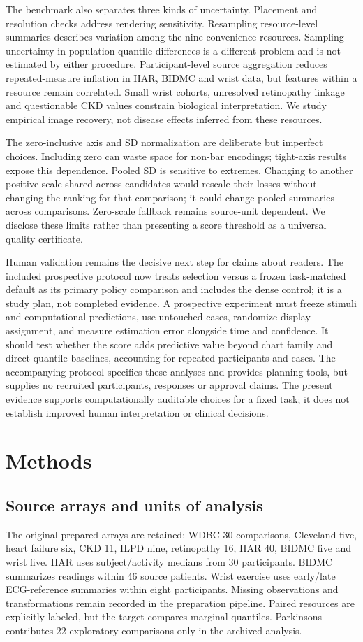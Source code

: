 \documentclass[11pt]{article}
\begin{document}
The benchmark also separates three kinds of uncertainty. Placement and resolution checks address rendering sensitivity. Resampling resource-level summaries describes variation among the nine convenience resources. Sampling uncertainty in population quantile differences is a different problem and is not estimated by either procedure. Participant-level source aggregation reduces repeated-measure inflation in HAR, BIDMC and wrist data, but features within a resource remain correlated. Small wrist cohorts, unresolved retinopathy linkage and questionable CKD values constrain biological interpretation. We study empirical image recovery, not disease effects inferred from these resources.

The zero-inclusive axis and SD normalization are deliberate but imperfect choices. Including zero can waste space for non-bar encodings; tight-axis results expose this dependence. Pooled SD is sensitive to extremes. Changing to another positive scale shared across candidates would rescale their losses without changing the ranking for that comparison; it could change pooled summaries across comparisons. Zero-scale fallback remains source-unit dependent. We disclose these limits rather than presenting a score threshold as a universal quality certificate.

Human validation remains the decisive next step for claims about readers. The included prospective protocol now treats selection versus a frozen task-matched default as its primary policy comparison and includes the dense control; it is a study plan, not completed evidence. A prospective experiment must freeze stimuli and computational predictions, use untouched cases, randomize display assignment, and measure estimation error alongside time and confidence. It should test whether the score adds predictive value beyond chart family and direct quantile baselines, accounting for repeated participants and cases. The accompanying protocol specifies these analyses and provides planning tools, but supplies no recruited participants, responses or approval claims. The present evidence supports computationally auditable choices for a fixed task; it does not establish improved human interpretation or clinical decisions.

\section*{Methods}
\subsection*{Source arrays and units of analysis}
The original prepared arrays are retained: WDBC 30 comparisons, Cleveland five, heart failure six, CKD 11, ILPD nine, retinopathy 16, HAR 40, BIDMC five and wrist five. HAR uses subject/activity medians from 30 participants. BIDMC summarizes readings within 46 source patients. Wrist exercise uses early/late ECG-reference summaries within eight participants.\cite{pimentel2017,jarchi2017} Missing observations and transformations remain recorded in the preparation pipeline. Paired resources are explicitly labeled, but the target compares marginal quantiles. Parkinsons contributes 22 exploratory comparisons only in the archived analysis.
\end{document}
